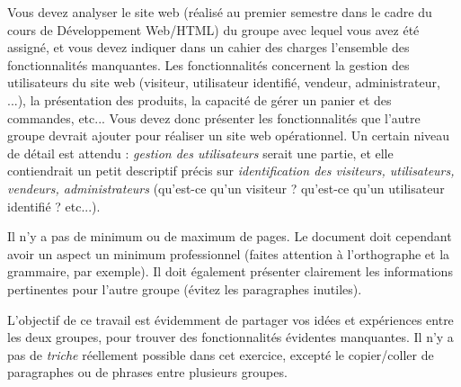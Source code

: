 

\vspace*{0.7cm}

\noindent {}

\bigskip

\noindent Vous devez analyser le site web (réalisé au premier semestre dans le cadre du cours de Développement Web/HTML) du groupe avec lequel vous avez été assigné, et vous devez indiquer dans un cahier des charges l'ensemble des fonctionnalités manquantes.
Les fonctionnalités concernent la gestion des utilisateurs du site web (visiteur, utilisateur identifié, vendeur, administrateur, ...), la présentation des produits, la capacité de gérer un panier et des commandes, etc...
Vous devez donc présenter les fonctionnalités que l'autre groupe devrait ajouter pour réaliser un site web opérationnel.
Un certain niveau de détail est attendu : \textit{gestion des utilisateurs} serait une partie, et elle contiendrait un petit descriptif précis sur  \textit{identification des visiteurs, utilisateurs, vendeurs, administrateurs} (qu'est-ce qu'un visiteur ? qu'est-ce qu'un utilisateur identifié ? etc...).

\bigskip

\noindent Il n'y a pas de minimum ou de maximum de pages.
Le document doit cependant avoir un aspect un minimum professionnel (faites attention à l'orthographe et la grammaire, par exemple).
Il doit également présenter clairement les informations pertinentes pour l'autre groupe (évitez les paragraphes inutiles).

\bigskip

\noindent L'objectif de ce travail est évidemment de partager vos idées et expériences entre les deux groupes, pour trouver des fonctionnalités évidentes manquantes.
Il n'y a pas de \textit{triche} réellement possible dans cet exercice, excepté le copier/coller de paragraphes ou de phrases entre plusieurs groupes.
